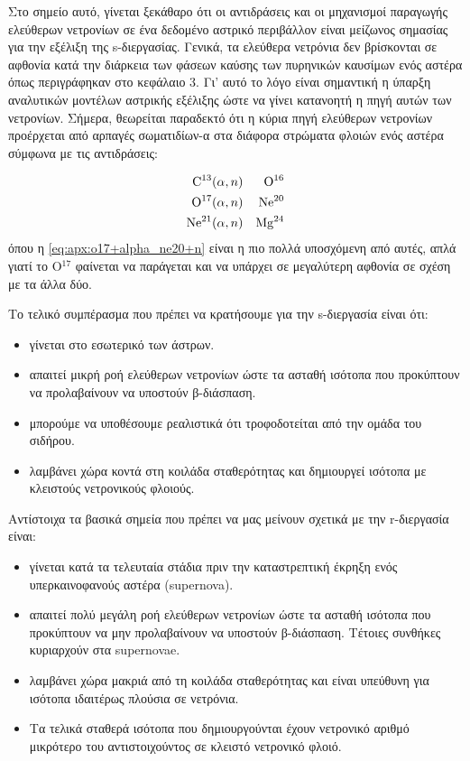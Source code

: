 Στο σημείο αυτό, γίνεται ξεκάθαρο ότι οι αντιδράσεις και οι μηχανισμοί παραγωγής ελεύθερων νετρονίων σε ένα δεδομένο αστρικό περιβάλλον είναι μείζωνος σημασίας για την εξέλιξη της s-διεργασίας. Γενικά, τα ελεύθερα νετρόνια δεν βρίσκονται σε αφθονία κατά την διάρκεια των φάσεων καύσης των πυρηνικών καυσίμων ενός αστέρα όπως περιγράφηκαν στο κεφάλαιο 3. Γι' αυτό το λόγο είναι σημαντική η ύπαρξη αναλυτικών μοντέλων αστρικής εξέλιξης ώστε να γίνει κατανοητή η πηγή αυτών των νετρονίων. Σήμερα, θεωρείται παραδεκτό ότι η κύρια πηγή ελεύθερων νετρονίων προέρχεται από αρπαγές σωματιδίων-α στα διάφορα στρώματα φλοιών ενός αστέρα σύμφωνα με τις αντιδράσεις:

\begin{eqnarray}
\rm C^{13}  &(\alpha, n)&  \rm O^{16} \label{eq:apx:c13+alpha_o16+n}\\
\rm O^{17}  &(\alpha, n)&  \rm Ne^{20} \label{eq:apx:o17+alpha_ne20+n}\\
\rm Ne^{21}  &(\alpha, n)& \rm Mg^{24} \label{eq:apx:ne21+alpha_mg24+n}
\end{eqnarray}
όπου η \eqref{eq:apx:o17+alpha_ne20+n} είναι η πιο πολλά υποσχόμενη από αυτές, απλά γιατί το O$^{17}$ φαίνεται να παράγεται και να υπάρχει σε μεγαλύτερη αφθονία σε σχέση με τα άλλα δύο.    

Το τελικό συμπέρασμα που πρέπει να κρατήσουμε για την s-διεργασία είναι ότι: 

\begin{itemize}
\item γίνεται στο εσωτερικό των άστρων.
\item απαιτεί μικρή ροή ελεύθερων νετρονίων ώστε τα ασταθή ισότοπα που προκύπτουν να προλαβαίνουν να υποστούν β-διάσπαση.
\item μπορούμε να υποθέσουμε ρεαλιστικά ότι τροφοδοτείται από την ομάδα του σιδήρου.
\item λαμβάνει χώρα κοντά στη κοιλάδα σταθερότητας και δημιουργεί ισότοπα με κλειστούς νετρονικούς φλοιούς.
\end{itemize}


Αντίστοιχα τα βασικά σημεία που πρέπει να μας μείνουν σχετικά με την r-διεργασία είναι:

\begin{itemize}
\item γίνεται κατά τα τελευταία στάδια πριν την καταστρεπτική έκρηξη ενός υπερκαινοφανούς αστέρα (supernova).
\item απαιτεί πολύ μεγάλη ροή ελεύθερων νετρονίων ώστε τα ασταθή ισότοπα που προκύπτουν να μην προλαβαίνουν να υποστούν β-διάσπαση. Τέτοιες συνθήκες κυριαρχούν στα supernovae.
\item λαμβάνει χώρα μακριά από τη κοιλάδα σταθερότητας και είναι υπεύθυνη για ισότοπα ιδαιτέρως πλούσια σε νετρόνια.
\item  Τα τελικά σταθερά ισότοπα που δημιουργούνται έχουν νετρονικό αριθμό μικρότερο του αντιστοιχούντος σε κλειστό νετρονικό φλοιό.
\end{itemize}



